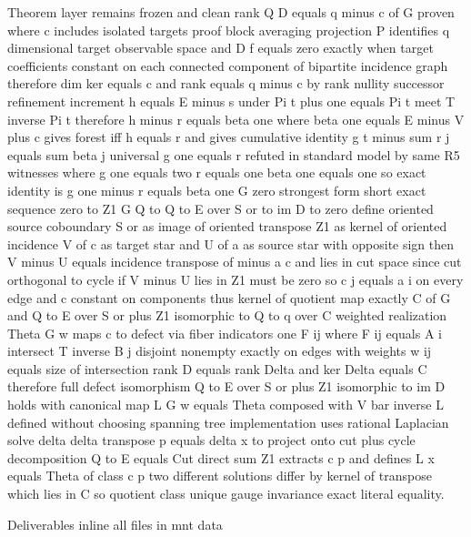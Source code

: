 Theorem layer remains frozen and clean rank Q D equals q minus c of G proven where c includes isolated targets proof block averaging projection P identifies q dimensional target observable space and D f equals zero exactly when target coefficients constant on each connected component of bipartite incidence graph therefore dim ker equals c and rank equals q minus c by rank nullity successor refinement increment h equals E minus s under Pi t plus one equals Pi t meet T inverse Pi t therefore h minus r equals beta one where beta one equals E minus V plus c gives forest iff h equals r and gives cumulative identity g t minus sum r j equals sum beta j universal g one equals r refuted in standard model by same R5 witnesses where g one equals two r equals one beta one equals one so exact identity is g one minus r equals beta one G zero strongest form short exact sequence zero to Z1 G Q to Q to E over S or to im D to zero define oriented source coboundary S or as image of oriented transpose Z1 as kernel of oriented incidence V of c as target star and U of a as source star with opposite sign then V minus U equals incidence transpose of minus a c and lies in cut space since cut orthogonal to cycle if V minus U lies in Z1 must be zero so c j equals a i on every edge and c constant on components thus kernel of quotient map exactly C of G and Q to E over S or plus Z1 isomorphic to Q to q over C weighted realization Theta G w maps c to defect via fiber indicators one F ij where F ij equals A i intersect T inverse B j disjoint nonempty exactly on edges with weights w ij equals size of intersection rank D equals rank Delta and ker Delta equals C therefore full defect isomorphism Q to E over S or plus Z1 isomorphic to im D holds with canonical map L G w equals Theta composed with V bar inverse L defined without choosing spanning tree implementation uses rational Laplacian solve delta delta transpose p equals delta x to project onto cut plus cycle decomposition Q to E equals Cut direct sum Z1 extracts c p and defines L x equals Theta of class c p two different solutions differ by kernel of transpose which lies in C so quotient class unique gauge invariance exact literal equality.

Deliverables inline all files in mnt data

